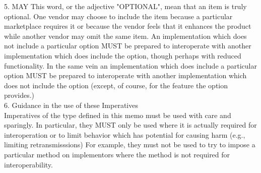 5. MAY   This word, or the adjective "OPTIONAL", mean that an item is
  truly optional.  One vendor may choose to include the item because a
  particular marketplace requires it or because the vendor feels that
  it enhances the product while another vendor may omit the same item.
  An implementation which does not include a particular option MUST be
  prepared to interoperate with another implementation which does
  include the option, though perhaps with reduced functionality. In the
  same vein an implementation which does include a particular option
  MUST be prepared to interoperate with another implementation which
  does not include the option (except, of course, for the feature the
  option provides.)\\

6. Guidance in the use of these Imperatives\\

  Imperatives of the type defined in this memo must be used with care
  and sparingly.  In particular, they MUST only be used where it is
  actually required for interoperation or to limit behavior which has
  potential for causing harm (e.g., limiting retransmisssions)  For
  example, they must not be used to try to impose a particular method
  on implementors where the method is not required for
  interoperability.\\
